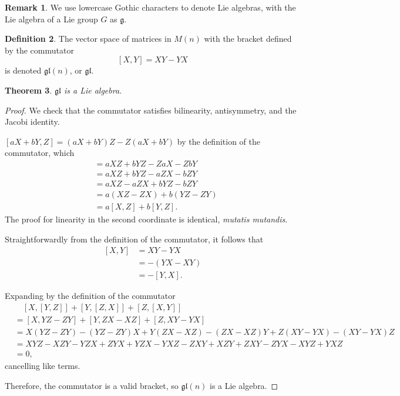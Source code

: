 \documentclass[12pt]{article}
\newcommand{\g}{\mathfrak{g}}
\newcommand{\gl}{\mathfrak{gl}}
\newtheorem{them}{Theorem}[section]
\theoremstyle{definition}
\theoremstyle{definition}
\theoremstyle{definition}
\theoremstyle{definition}
\newtheorem{rmk}[them]{Remark}
\theoremstyle{definition}
\newtheorem{defn}[them]{Definition}
\theoremstyle{definition}
\theoremstyle{definition}
\theoremstyle{definition}
\begin{document}
\begin{rmk}We use lowercase Gothic characters to
denote Lie algebras, with the Lie algebra of a Lie
group $G$ as $\g$.\end{rmk}

\begin{defn} The vector space of matrices in
$M(n)$ with the bracket defined by the commutator 
\[
    [X, Y] = XY - YX
\] is denoted $\gl(n)$, or $\gl$.
\end{defn}

\begin{them}$\gl$ is a Lie algebra.\end{them}
\begin{proof}
\par{We check that the commutator satisfies
bilinearity, antisymmetry, and the Jacobi
identity.}
\par{$[aX + bY, Z] = (aX + bY)Z - Z(aX + bY)$ by
the definition of the commutator, which 
\[\begin{aligned}& = aXZ + bYZ - ZaX - ZbY \\
& = aXZ + bYZ - aZX - bZY \\
& = aXZ - aZX + bYZ - bZY \\
& = a(XZ - ZX) + b(YZ - ZY) \\
& = a[X, Z] + b[Y, Z].\end{aligned}\] The proof for linearity
in the second coordinate is identical,
\textit{mutatis mutandis}.}
\par{Straightforwardly from the definition of the
commutator, it follows that
\[\begin{aligned}
    [X, Y] & = XY - YX \\ & = -(YX - XY) \\ & = -[Y,X].
\end{aligned}\]}
\par{Expanding by the definition of the
commutator 
\[\begin{aligned} 
&\quad [X, [Y, Z]] + [Y, [Z,
X]] + [Z, [X, Y]] \\ 
& = [X, YZ - ZY] + [Y, ZX - XZ] +
[Z, XY - YX] \\
& = X(YZ - ZY) - (YZ-ZY)X + Y(ZX-XZ) - (ZX-XZ)Y +
Z(XY-YX) - (XY-YX)Z \\
& = XYZ - XZY - YZX + ZYX + YZX - YXZ - ZXY + XZY
+ ZXY - ZYX - XYZ + YXZ \\
& = 0,\end{aligned}\] cancelling like terms.}
\par{Therefore, the commutator is a valid bracket,
so $\gl(n)$ is a Lie algebra.}
\end{proof}
\end{document}
